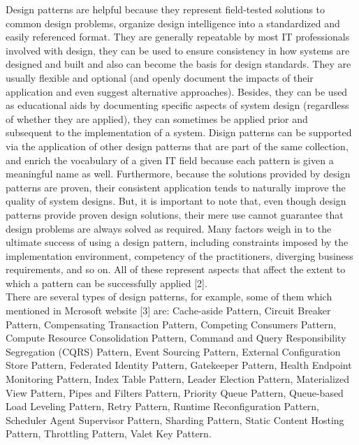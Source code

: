 \documentclass[10pt, conference]{IEEEtran}
\begin{document}
\indent Design patterns are helpful because they represent field-tested solutions to common design problems, organize design intelligence into a standardized and easily referenced format. They are generally repeatable by most IT professionals involved with design, they can be used to ensure consistency in how systems are designed and built and also can become the basis for design standards. They are usually flexible and optional (and openly document the impacts of their application and even suggest alternative approaches). Besides, they can be used as educational aids by documenting specific aspects of system design (regardless of whether they are applied), they can sometimes be applied prior and subsequent to the implementation of a system. Disign patterns can be supported via the application of other design patterns that are part of the same collection, and enrich the vocabulary of a given IT field because each pattern is given a meaningful name as well. Furthermore, because the solutions provided by design patterns are proven, their consistent application tends to naturally improve the quality of system designs. But, it is important to note that, even though design patterns provide proven design solutions, their mere use cannot guarantee that design problems are always solved as required. Many factors weigh in to the ultimate success of using a design pattern, including constraints imposed by the implementation environment, competency of the practitioners, diverging business requirements, and so on. All of these represent aspects that affect the extent to which a pattern can be successfully applied [2]. \\
\indent There are several types of design patterns, for example, some of them which mentioned in Mcrosoft website [3] are: Cache-aside Pattern, Circuit Breaker Pattern, Compensating Transaction Pattern, Competing Consumers Pattern, Compute Resource Consolidation Pattern, Command and Query Responsibility Segregation (CQRS) Pattern, Event Sourcing Pattern, External Configuration Store Pattern, Federated Identity Pattern, Gatekeeper Pattern, Health Endpoint Monitoring Pattern, Index Table Pattern, Leader Election Pattern, Materialized View Pattern, Pipes and Filters Pattern, Priority Queue Pattern, Queue-based Load Leveling Pattern, Retry Pattern, Runtime Reconfiguration Pattern, Scheduler Agent Supervisor Pattern, Sharding Pattern, Static Content Hosting Pattern, Throttling Pattern, Valet Key Pattern.
 
\end{document}
